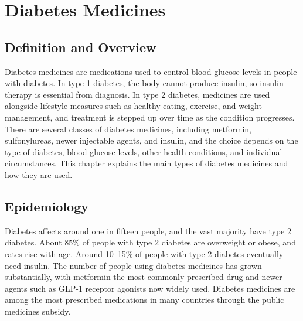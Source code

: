 \chapter{Diabetes Medicines}

\section*{Definition and Overview}
Diabetes medicines are medications used to control blood glucose levels in people with diabetes. In type 1 diabetes, the body cannot produce insulin, so insulin therapy is essential from diagnosis. In type 2 diabetes, medicines are used alongside lifestyle measures such as healthy eating, exercise, and weight management, and treatment is stepped up over time as the condition progresses. There are several classes of diabetes medicines, including metformin, sulfonylureas, newer injectable agents, and insulin, and the choice depends on the type of diabetes, blood glucose levels, other health conditions, and individual circumstances. This chapter explains the main types of diabetes medicines and how they are used.

\section*{Epidemiology}
Diabetes affects around one in fifteen people, and the vast majority have type 2 diabetes. About 85\% of people with type 2 diabetes are overweight or obese, and rates rise with age. Around 10--15\% of people with type 2 diabetes eventually need insulin. The number of people using diabetes medicines has grown substantially, with metformin the most commonly prescribed drug and newer agents such as GLP-1 receptor agonists now widely used. Diabetes medicines are among the most prescribed medications in many countries through the public medicines subsidy.


